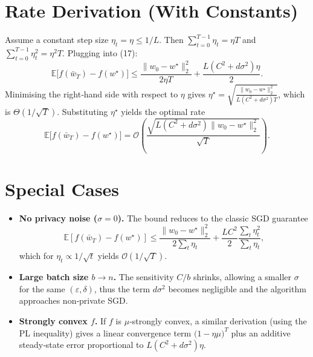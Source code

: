 \documentclass{article}
\begin{document}
\bigskip

\section*{Rate Derivation (With Constants)}
Assume a constant step size $\eta_t=\eta\le 1/L$. Then $\sum_{t=0}^{T-1}\eta_t=\eta T$ and $\sum_{t=0}^{T-1}\eta_t^{2}=\eta^{2}T$. Plugging into (17):
\[
\mathbb{E}\bigl[f(\bar w_T)-f(w^{\star})\bigr]
\le
\frac{\|w_0-w^{\star}\|_2^{2}}{2\eta T}
+\frac{L(C^{2}+d\sigma^{2})\eta}{2}.
\]
Minimising the right‑hand side with respect to $\eta$ gives $\eta^{\star}= \sqrt{\frac{\|w_0-w^{\star}\|_2^{2}}{L(C^{2}+d\sigma^{2})T}}$, which is $\Theta(1/\sqrt{T})$. Substituting $\eta^{\star}$ yields the optimal rate
\[
\mathbb{E}\bigl[f(\bar w_T)-f(w^{\star})\bigr]
= \mathcal{O}\!\left(\frac{\sqrt{L(C^{2}+d\sigma^{2})\|w_0-w^{\star}\|_2^{2}}}{\sqrt{T}}\right).
\]

\bigskip

\section*{Special Cases}
\begin{itemize}
\item \textbf{No privacy noise ($\sigma=0$).} The bound reduces to the classic SGD guarantee
\[
\mathbb{E}[f(\bar w_T)-f(w^{\star})]\le
\frac{\|w_0-w^{\star}\|_2^{2}}{2\sum_{t}\eta_t}
+\frac{L C^{2}}{2}\frac{\sum_{t}\eta_t^{2}}{\sum_{t}\eta_t},
\]
which for $\eta_t\propto 1/\sqrt{t}$ yields $\mathcal{O}(1/\sqrt{T})$.

\item \textbf{Large batch size $b\to n$.} The sensitivity $C/b$ shrinks, allowing a smaller $\sigma$ for the same $(\varepsilon,\delta)$, thus the term $d\sigma^{2}$ becomes negligible and the algorithm approaches non‑private SGD.

\item \textbf{Strongly convex $f$.} If $f$ is $\mu$‑strongly convex, a similar derivation (using the PL inequality) gives a linear convergence term $\bigl(1-\eta\mu\bigr)^{T}$ plus an additive steady‑state error proportional to $L(C^{2}+d\sigma^{2})\eta$.
\end{itemize}

\bigskip
\end{document}
